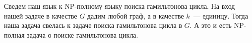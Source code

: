 \begin{task}{5}
Сведем наш язык к NP-полному языку поиска гамильтонова цикла. На вход нашей задаче в качестве $G$ дадим любой граф, а в качестве $k$~--- единицу. Тогда наша задача свелась к задаче поиска гамильтонова цикла в $G$. А это и есть NP-полная задача о поиске гамильтонова цикла.
\end{task}